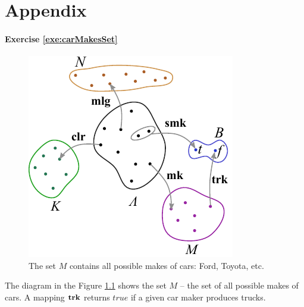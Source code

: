 \graphicspath{{../08Appendix/pics/}}


\chapter{Appendix}\label{ch:Appendix}
\footnotesize

\subsubsection*{Exercise \ref{exe:carMakesSet}}

\begin{figure}[htbp]
  \centering
  \includegraphics[scale=1.0]{diagramCars}
  \caption{The set $M$ contains all possible makes of cars: Ford,
    Toyota, etc.}
  \label{fig:diagramCars}
\end{figure}

The diagram in the Figure \ref{fig:diagramCars} shows the set $M$ -- the set
of all possible makes of cars. A mapping $\textrm{\bf {trk}}$ returns $true$ if a
given car maker produces trucks.

